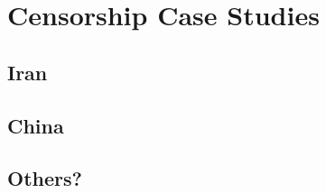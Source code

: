 %
\section{Censorship Case Studies} 
\label{section:historical}

\subsection{Iran}
\subsection{China}
\subsection{Others?}


